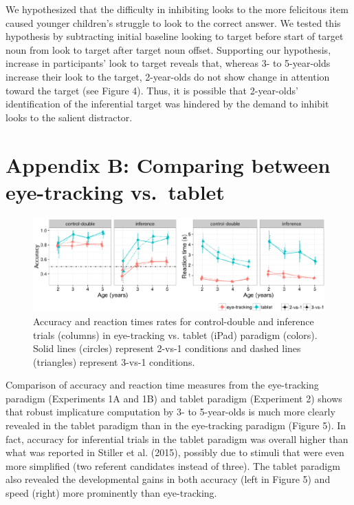 \documentclass[a4paper,man,apacite,floatsintext]{apa6}
\newenvironment{CodeChunk}{}{}
\begin{document}
We hypothesized that the difficulty in inhibiting looks to the more
felicitous item caused younger children's struggle to look to the
correct answer. We tested this hypothesis by subtracting initial
baseline looking to target before start of target noun from look to
target after target noun offset. Supporting our hypothesis, increase in
participants' look to target reveals that, whereas 3- to 5-year-olds
increase their look to the target, 2-year-olds do not show change in
attention toward the target (see Figure 4). Thus, it is possible that
2-year-olds' identification of the inferential target was hindered by
the demand to inhibit looks to the salient distractor.

\section{Appendix B: Comparing between eye-tracking
vs.~tablet}\label{appendix-b-comparing-between-eye-tracking-vs.tablet}

\begin{CodeChunk}
\begin{figure}[H]

{\centering \includegraphics{figs/etip_compd-1} 

}

\caption[Accuracy and reaction times rates for control-double and inference trials (columns) in eye-tracking vs]{Accuracy and reaction times rates for control-double and inference trials (columns) in eye-tracking vs. tablet (iPad) paradigm (colors). Solid lines (circles) represent 2-vs-1 conditions and dashed lines (triangles) represent 3-vs-1 conditions.}\label{fig:etip_compd}
\end{figure}
\end{CodeChunk}

Comparison of accuracy and reaction time measures from the eye-tracking
paradigm (Experiments 1A and 1B) and tablet paradigm (Experiment 2)
shows that robust implicature computation by 3- to 5-year-olds is much
more clearly revealed in the tablet paradigm than in the eye-tracking
paradigm (Figure 5). In fact, accuracy for inferential trials in the
tablet paradigm was overall higher than what was reported in Stiller et
al. (2015), possibly due to stimuli that were even more simplified (two
referent candidates instead of three). The tablet paradigm also revealed
the developmental gains in both accuracy (left in Figure 5) and speed
(right) more prominently than eye-tracking.
\end{document}
